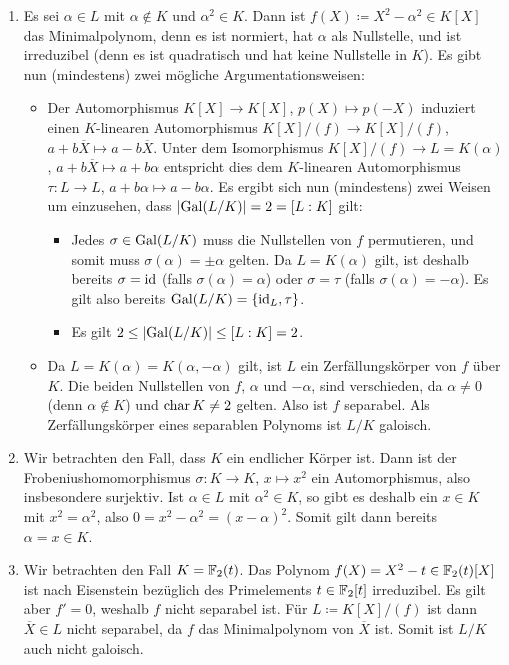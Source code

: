 \begin{solution}
\begin{enumerate}
    \item
      Es sei $\alpha \in L$ mit $\alpha \notin K$ und $\alpha^2 \in K$.
      Dann ist $f(X) \coloneqq X^2 - \alpha^2 \in K[X]$ das Minimalpolynom, denn es ist normiert, hat $\alpha$ als Nullstelle, und ist irreduzibel (denn es ist quadratisch und hat keine Nullstelle in $K$).
      Es gibt nun (mindestens) zwei mögliche Argumentationsweisen:
      \begin{itemize}
        \item
          Der Automorphismus $K[X] \to K[X]$, $p(X) \mapsto p(-X)$ induziert einen $K$-linearen Automorphismus $K[X]/(f) \to K[X]/(f)$, $a + b \overline{X} \mapsto a - b \overline{X}$.
          Unter dem Isomorphismus $K[X]/(f) \to L = K(\alpha)$, $a + b \overline{X} \mapsto a + b \alpha$ entspricht dies dem $K$-linearen Automorphismus $\tau \colon L \to L$, $a + b \alpha \mapsto a - b \alpha$.
          Es ergibt sich nun (mindestens) zwei Weisen um einzusehen, dass $|{\operatorname{Gal}(L/K)}| = 2 = [L : K]$ gilt:
          \begin{itemize}
            \item
              Jedes $\sigma \in \operatorname{Gal}(L/K)$ muss die Nullstellen von $f$ permutieren, und somit muss $\sigma(\alpha) = \pm \alpha$ gelten.
              Da $L = K(\alpha)$ gilt, ist deshalb bereits $\sigma = \operatorname{id}$ (falls $\sigma(\alpha) = \alpha$) oder $\sigma = \tau$ (falls $\sigma(\alpha) = - \alpha$).
              Es gilt also bereits $\operatorname{Gal}(L/K) = \{\operatorname{id}_L, \tau\}$.
            \item
              Es gilt $2 \leq |{\operatorname{Gal}(L/K)}| \leq [L : K] = 2$.
          \end{itemize}
        \item
          Da $L = K(\alpha) = K(\alpha, -\alpha)$ gilt, ist $L$ ein Zerfällungskörper von $f$ über $K$.
          Die beiden Nullstellen von $f$, $\alpha$ und $-\alpha$, sind verschieden, da $\alpha \neq 0$ (denn $\alpha \notin K$) und $\operatorname{char} K \neq 2$ gelten.
          Also ist $f$ separabel.
          Als Zerfällungskörper eines separablen Polynoms ist $L/K$ galoisch.
      \end{itemize}
      
    \item
      Wir betrachten den Fall, dass $K$ ein endlicher Körper ist.
      Dann ist der Frobeniushomomorphismus $\sigma \colon K \to K$, $x \mapsto x^2$ ein Automorphismus, also insbesondere surjektiv.
      Ist $\alpha \in L$ mit $\alpha^2 \in K$, so gibt es deshalb ein $x \in K$ mit $x^2 = \alpha^2$, also $0 = x^2 - \alpha^2 = (x - \alpha)^2$.
      Somit gilt dann bereits $\alpha = x \in K$.
      
    \item
      Wir betrachten den Fall $K = \mathbb{F}_2(t)$.
      Das Polynom $f(X) = X^2 - t \in \mathbb{F}_2(t)[X]$ ist nach Eisenstein bezüglich des Primelements $t \in \mathbb{F}_2[t]$ irreduzibel.
      Es gilt aber $f' = 0$, weshalb $f$ nicht separabel ist.
      Für $L \coloneqq K[X]/(f)$ ist dann $\overline{X} \in L$ nicht separabel, da $f$ das Minimalpolynom von $\overline{X}$ ist.
      Somit ist $L/K$ auch nicht galoisch.
  \end{enumerate}
\end{solution}


